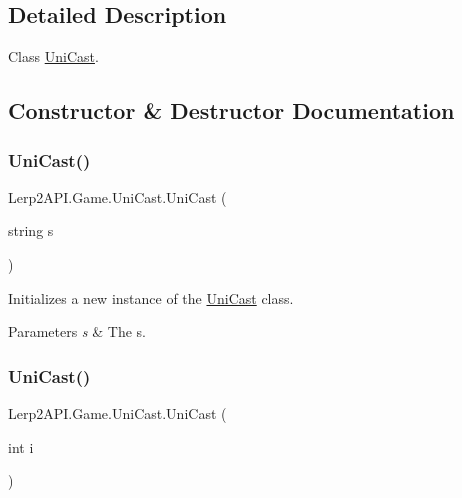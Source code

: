 \subsection{Detailed Description}
Class \hyperlink{class_lerp2_a_p_i_1_1_game_1_1_uni_cast}{Uni\+Cast}. 



\subsection{Constructor \& Destructor Documentation}
\mbox{\label{class_lerp2_a_p_i_1_1_game_1_1_uni_cast_a6289e1b6b4ff6ae7287e4f304b22d087}} 
\subsubsection{\texorpdfstring{Uni\+Cast()}{UniCast()}\hspace{0.1cm}{\footnotesize\ttfamily [1/4]}}
{\footnotesize\ttfamily Lerp2\+A\+P\+I.\+Game.\+Uni\+Cast.\+Uni\+Cast (\begin{DoxyParamCaption}\item[{string}]{s }\end{DoxyParamCaption})\hspace{0.3cm}{\ttfamily [inline]}}



Initializes a new instance of the \hyperlink{class_lerp2_a_p_i_1_1_game_1_1_uni_cast}{Uni\+Cast} class. 


\begin{DoxyParams}{Parameters}
{\em s} & The s.\\
\hline
\end{DoxyParams}
\mbox{\label{class_lerp2_a_p_i_1_1_game_1_1_uni_cast_add37c0736524043407545239380babde}} 
\subsubsection{\texorpdfstring{Uni\+Cast()}{UniCast()}\hspace{0.1cm}{\footnotesize\ttfamily [2/4]}}
{\footnotesize\ttfamily Lerp2\+A\+P\+I.\+Game.\+Uni\+Cast.\+Uni\+Cast (\begin{DoxyParamCaption}\item[{int}]{i }\end{DoxyParamCaption})\hspace{0.3cm}{\ttfamily [inline]}}



